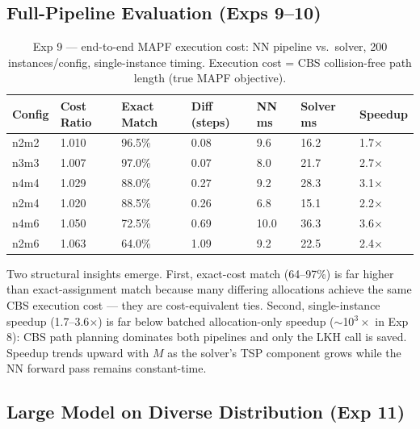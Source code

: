 \documentclass[11pt,a4paper]{article}
\begin{document}
\subsection{Full-Pipeline Evaluation (Exps 9--10)}

\begin{table}[htbp]
\centering
\caption{Exp 9 --- end-to-end MAPF execution cost: NN pipeline vs.\ solver, 200 instances/config,
single-instance timing. Execution cost = CBS collision-free path length (true MAPF objective).}
\begin{tabularx}{\textwidth}{lXXXXXX}
\toprule
\textbf{Config} & \textbf{Cost Ratio} & \textbf{Exact Match} & \textbf{Diff (steps)} &
  \textbf{NN ms} & \textbf{Solver ms} & \textbf{Speedup} \\
\midrule
n2m2 & 1.010 & 96.5\% & 0.08 & 9.6  & 16.2 & 1.7$\times$ \\
n3m3 & 1.007 & 97.0\% & 0.07 & 8.0  & 21.7 & 2.7$\times$ \\
n4m4 & 1.029 & 88.0\% & 0.27 & 9.2  & 28.3 & 3.1$\times$ \\
n2m4 & 1.020 & 88.5\% & 0.26 & 6.8  & 15.1 & 2.2$\times$ \\
n4m6 & 1.050 & 72.5\% & 0.69 & 10.0 & 36.3 & 3.6$\times$ \\
n2m6 & 1.063 & 64.0\% & 1.09 & 9.2  & 22.5 & 2.4$\times$ \\
\bottomrule
\end{tabularx}
\label{tab:pipeline9}
\end{table}

Two structural insights emerge. First, exact-cost match (64--97\%) is far higher than
exact-assignment match because many differing allocations achieve the same CBS execution cost
--- they are cost-equivalent ties. Second, single-instance speedup (1.7--3.6$\times$) is far
below batched allocation-only speedup ($\sim$10$^3\times$ in Exp 8): CBS path planning
dominates both pipelines and only the LKH call is saved. Speedup trends upward with $M$ as
the solver's TSP component grows while the NN forward pass remains constant-time.

\subsection{Large Model on Diverse Distribution (Exp 11)}
\end{document}
